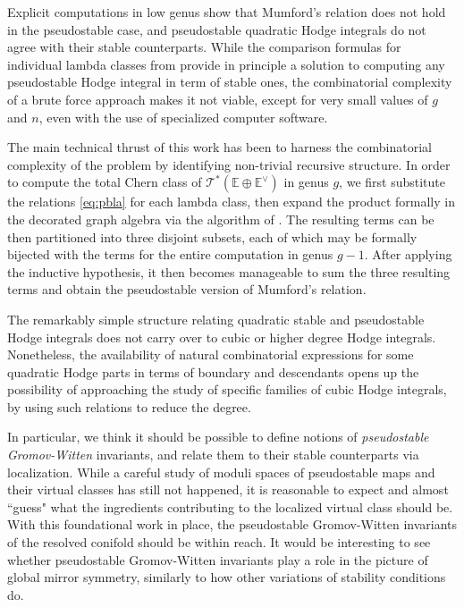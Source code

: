 \documentclass[leqno,12pt]{amsart}
\theoremstyle{remark}
\numberwithin{equation}{section}
\begin{document}
Explicit computations in low genus show that Mumford's relation does not hold in the pseudostable case, and pseudostable quadratic Hodge integrals do not agree with their stable counterparts. While the comparison formulas for individual lambda classes from \cite{PSHI} provide in principle a solution to computing any pseudostable Hodge integral in term of stable ones, the combinatorial complexity of a brute force approach makes it not viable, except for very small values of $g$ and $n$, even with the use of specialized computer software.

The main technical thrust of this work has been to harness the combinatorial complexity of the problem by identifying  non-trivial recursive structure.
In order to compute the total Chern class of $\mathcal{T}^\ast(\mathbb{E}\oplus \mathbb{E}^\vee)$ in genus $g$, we first substitute the relations \eqref{eq:pbla} for each lambda class, then expand the product formally in the decorated graph algebra via the algorithm of \cite{Yang}. The resulting terms can be then partitioned into three disjoint subsets, each of which may be formally bijected with the terms for the entire computation in genus $g-1$. After applying the inductive hypothesis, it then becomes manageable to sum the three resulting terms and obtain the pseudostable version of Mumford's relation.

The remarkably simple structure relating quadratic stable and pseudostable Hodge integrals does not carry over to cubic or higher degree  Hodge integrals. Nonetheless, the availability of natural combinatorial expressions for some quadratic Hodge parts in terms of boundary and descendants opens up the possibility of approaching the study of specific families of cubic Hodge integrals, by using such relations to reduce the degree. 

In particular, we think it should be possible to define notions of {\it pseudostable Gromov-Witten} invariants, and relate them to their stable counterparts via localization. While a careful study of moduli spaces of pseudostable maps and their virtual classes has still not happened, it is reasonable to expect and almost ``guess" what the ingredients contributing to the localized virtual class should be. With this foundational work in place, the pseudostable Gromov-Witten invariants of the resolved conifold should be within reach. It would be interesting to see whether pseudostable Gromov-Witten invariants play a role in the picture of global mirror symmetry, similarly to how other variations of stability conditions do.
\end{document}
